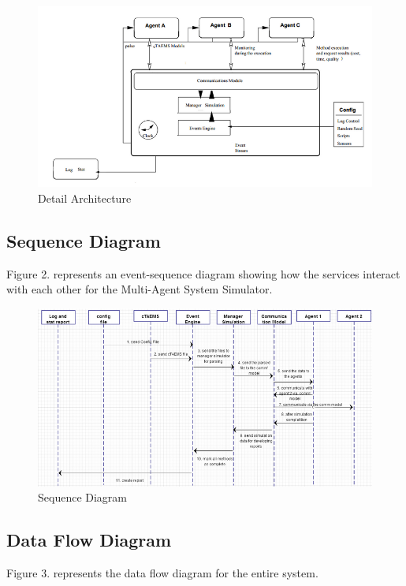\documentclass{article}
\begin{document}
\begin{figure}
\centering
\includegraphics[width=4.5in]{fig1}
\caption{Detail Architecture}
\label{fig_sim}
\end{figure}


\subsection{Sequence Diagram}

Figure 2. represents an event-sequence diagram showing how the services interact with each other for the Multi-Agent System Simulator. 

\begin{figure}
\centering
\includegraphics[width=6.0in]{fig2}
\caption{Sequence Diagram}
\label{fig_sim}
\end{figure}

\newpage
\subsection{Data Flow Diagram}

Figure 3. represents the data flow diagram for the entire system.
\end{document}
